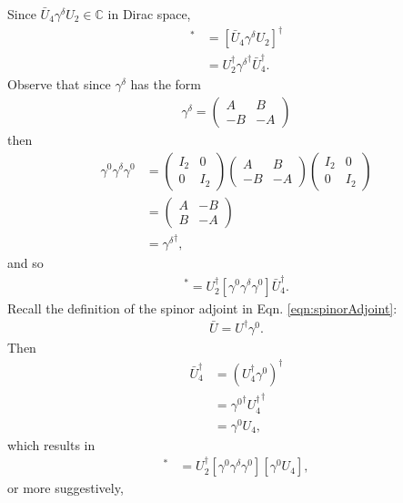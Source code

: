 Since $\bar{U}_4\gamma^\delta U_2 \in \mathbb{C}$ in Dirac space, 
\begin{align*}
[\bar{U}_4\gamma^\delta U_2]^*&=[\bar{U}_4\gamma^\delta U_2]^\dagger\\
&=U^\dagger _2 {\gamma^\delta}^\dagger \bar{U}_4 ^\dagger.
\end{align*}
Observe that since $\gamma^\delta$ has the form
\begin{align*}
\gamma^\delta=	\begin{pmatrix}
			A&B\\
			-B&-A
			\end{pmatrix}
\end{align*}
then
\begin{align*}
\gamma^0\gamma^\delta\gamma^0 &=	
	\begin{pmatrix}
	I_2 & 0\\
	0 & I_2
	\end{pmatrix}
	\begin{pmatrix}
	A&B\\
	-B&-A
	\end{pmatrix}
	\begin{pmatrix}
	I_2 & 0\\
	0 & I_2
	\end{pmatrix}
\\
&=	\begin{pmatrix}
	A&-B\\
	B&-A
	\end{pmatrix}
\\
&= {\gamma^\delta}^\dagger,
\end{align*}
and so
\begin{align*}
[\bar{U}_4\gamma^\delta U_2]^*=U^\dagger _2 [\gamma^0 \gamma^\delta \gamma^0] \bar{U}_4 ^\dagger.
\end{align*}
Recall the definition of the spinor adjoint in Eqn. \ref{eqn:spinorAdjoint}:
\begin{align*}
\bar{U}=U^\dagger \gamma^0.
\end{align*}
Then
\begin{align*}
\bar{U}_4 ^\dagger&=(U_4 ^\dagger \gamma^0)^\dagger\\
&={\gamma^0}^\dagger {U_4^\dagger}^\dagger\\
&=\gamma^0 U_4,
\end{align*}
which results in
\begin{align*}
[\bar{U}_4\gamma^\delta U_2]^*&=U^\dagger _2 [\gamma^0 \gamma^\delta \gamma^0] [\gamma^0 U_4],
\end{align*}
or more suggestively,

